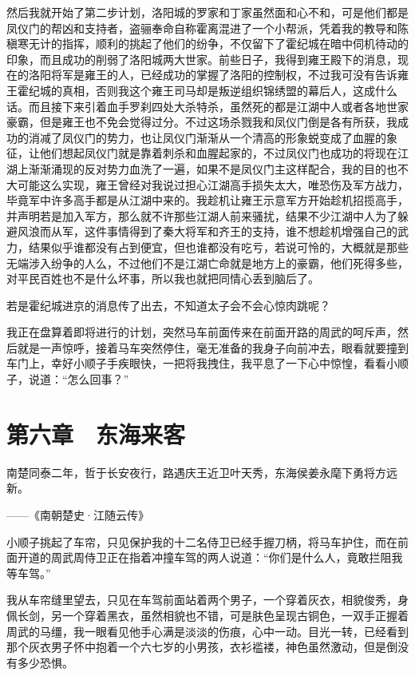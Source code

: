 然后我就开始了第二步计划，洛阳城的罗家和丁家虽然面和心不和，可是他们都是凤仪门的帮凶和支持者，盗骊奉命自称霍离混进了一个小帮派，凭着我的教导和陈稹寒无计的指挥，顺利的挑起了他们的纷争，不仅留下了霍纪城在暗中伺机待动的印象，而且成功的削弱了洛阳城两大世家。前些日子，我得到雍王殿下的消息，现在的洛阳将军是雍王的人，已经成功的掌握了洛阳的控制权，不过我可没有告诉雍王霍纪城的真相，否则我这个雍王司马却是叛逆组织锦绣盟的幕后人，这成什么话。而且接下来引着血手罗刹四处大杀特杀，虽然死的都是江湖中人或者各地世家豪霸，但是雍王也不免会觉得过分。不过这场杀戮我和凤仪门倒是各有所获，我成功的消减了凤仪门的势力，也让凤仪门渐渐从一个清高的形象蜕变成了血腥的象征，让他们想起凤仪门就是靠着刺杀和血腥起家的，不过凤仪门也成功的将现在江湖上渐渐涌现的反对势力血洗了一遍，如果不是凤仪门主这样配合，我的目的也不大可能这么实现，雍王曾经对我说过担心江湖高手损失太大，唯恐伤及军方战力，毕竟军中许多高手都是从江湖中来的。我趁机让雍王示意军方开始趁机招揽高手，并声明若是加入军方，那么就不许那些江湖人前来骚扰，结果不少江湖中人为了躲避风浪而从军，这件事情得到了秦大将军和齐王的支持，谁不想趁机增强自己的武力，结果似乎谁都没有占到便宜，但也谁都没有吃亏，若说可怜的，大概就是那些无端涉入纷争的人么，不过他们不是江湖亡命就是地方上的豪霸，他们死得多些，对平民百姓也不是什么坏事，所以我也就把同情心丢到脑后了。

若是霍纪城进京的消息传了出去，不知道太子会不会心惊肉跳呢？

我正在盘算着即将进行的计划，突然马车前面传来在前面开路的周武的呵斥声，然后就是一声惊呼，接着马车突然停住，毫无准备的我身子向前冲去，眼看就要撞到车门上，幸好小顺子手疾眼快，一把将我拽住，我平息了一下心中惊惶，看看小顺子，说道：“怎么回事？”

\chapter{第六章　东海来客}

南楚同泰二年，哲于长安夜行，路遇庆王近卫叶天秀，东海侯姜永麾下勇将方远新。

——《南朝楚史·江随云传》

小顺子挑起了车帘，只见保护我的十二名侍卫已经手握刀柄，将马车护住，而在前面开道的周武周侍卫正在指着冲撞车驾的两人说道：“你们是什么人，竟敢拦阻我等车驾。”

我从车帘缝里望去，只见在车驾前面站着两个男子，一个穿着灰衣，相貌俊秀，身佩长剑，另一个穿着黑衣，虽然相貌也不错，可是肤色呈现古铜色，一双手正握着周武的马缰，我一眼看见他手心满是淡淡的伤痕，心中一动。目光一转，已经看到那个灰衣男子怀中抱着一个六七岁的小男孩，衣衫褴褛，神色虽然激动，但是倒没有多少恐惧。

